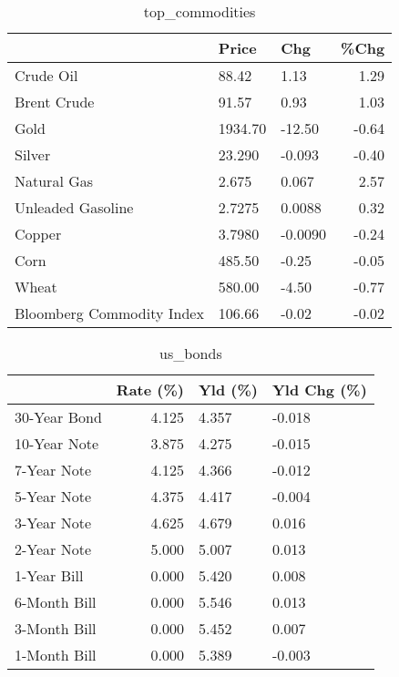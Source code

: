 \documentclass{article}%
\begin{document}
\begin{table}[htbp]%
\caption{top\_commodities}%
\centering%
\begin{adjustbox}{width=1\textwidth}%
\begin{tabular}{lllr}
\toprule
                          &   Price &     Chg &  \%Chg \\
\midrule
               Crude Oil  &   88.42 &    1.13 &  1.29 \\
             Brent Crude  &   91.57 &    0.93 &  1.03 \\
                    Gold  & 1934.70 &  -12.50 & -0.64 \\
                  Silver  &  23.290 &  -0.093 & -0.40 \\
             Natural Gas  &   2.675 &   0.067 &  2.57 \\
       Unleaded Gasoline  &  2.7275 &  0.0088 &  0.32 \\
                  Copper  &  3.7980 & -0.0090 & -0.24 \\
                    Corn  &  485.50 &   -0.25 & -0.05 \\
                   Wheat  &  580.00 &   -4.50 & -0.77 \\
Bloomberg Commodity Index &  106.66 &   -0.02 & -0.02 \\
\bottomrule
\end{tabular}
%
\end{adjustbox}%
\end{table}

%


\begin{table}[htbp]%
\caption{us\_bonds}%
\centering%
\begin{adjustbox}{width=1\textwidth}%
\begin{tabular}{lrll}
\toprule
             &  Rate (\%) & Yld (\%) & Yld Chg (\%) \\
\midrule
30-Year Bond &     4.125 &   4.357 &      -0.018 \\
10-Year Note &     3.875 &   4.275 &      -0.015 \\
 7-Year Note &     4.125 &   4.366 &      -0.012 \\
 5-Year Note &     4.375 &   4.417 &      -0.004 \\
 3-Year Note &     4.625 &   4.679 &       0.016 \\
 2-Year Note &     5.000 &   5.007 &       0.013 \\
 1-Year Bill &     0.000 &   5.420 &       0.008 \\
6-Month Bill &     0.000 &   5.546 &       0.013 \\
3-Month Bill &     0.000 &   5.452 &       0.007 \\
1-Month Bill &     0.000 &   5.389 &      -0.003 \\
\bottomrule
\end{tabular}
%
\end{adjustbox}%
\end{table}
\end{document}
